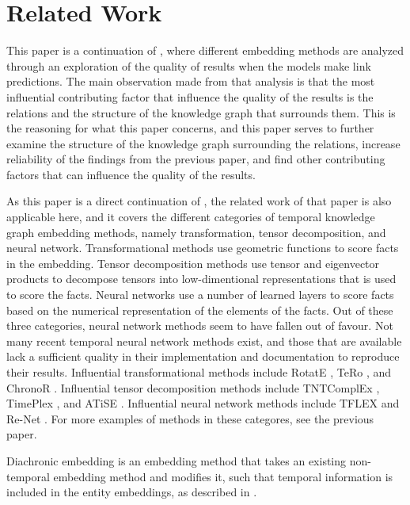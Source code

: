 \section{Related Work}
\label{sec:related-work}

This paper is a continuation of \cite{P9}, where different embedding methods are analyzed through an exploration of the quality of results when the models make link predictions. The main observation made from that analysis is that the most influential contributing factor that influence the quality of the results is the relations and the structure of the knowledge graph that surrounds them. This is the reasoning for what this paper concerns, and this paper serves to further examine the structure of the knowledge graph surrounding the relations, increase reliability of the findings from the previous paper, and find other contributing factors that can influence the quality of the results.

As this paper is a direct continuation of \cite{P9}, the related work of that paper is also applicable here, and it covers the different categories of temporal knowledge graph embedding methods, namely transformation, tensor decomposition, and neural network. Transformational methods use geometric functions to score facts in the embedding. Tensor decomposition methods use tensor and eigenvector products to decompose tensors into low-dimentional representations that is used to score the facts. Neural networks use a number of learned layers to score facts based on the numerical representation of the elements of the facts. Out of these three categories, neural network methods seem to have fallen out of favour. Not many recent temporal neural network methods exist, and those that are available lack a sufficient quality in their implementation and documentation to reproduce their results. Influential transformational methods include RotatE \cite{sun2019rotate}, TeRo \cite{xu2020tero}, and ChronoR \cite{sadeighan2021chronor}. Influential tensor decomposition methods include TNTComplEx \cite{lacroix2020tcomplex}, TimePlex \cite{jain2020timeplex}, and ATiSE \cite{xu19atise}. Influential neural network methods include TFLEX \cite{lin22tflex} and Re-Net \cite{jin2019renet}. For more examples of methods in these categores, see the previous paper.

Diachronic embedding is an embedding method that takes an existing non-temporal embedding method and modifies it, such that temporal information is included in the entity embeddings, as described in \cite{goel19diachronicemb}. 

